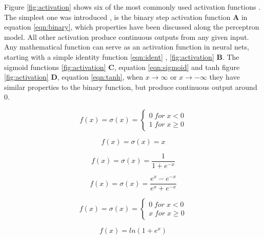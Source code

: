 Figure \ref{fig:activation} shows six of the most commonly used activation functions
\cite{warner1996understanding}. The simplest one was introduced , is the binary step activation function \textbf{A} in
equation \ref{eqn:binary}, which properties have been discussed along the perceptron model. All other
activation produce continuous outputs from any given input. Any mathematical function can serve as
an activation function in neural nets, starting with a simple identity function \ref{eqn:ident} ,
\ref{fig:activation} \textbf{B}.  The sigmoid functions \ref{fig:activation} \textbf{C}, equation \ref{eqn:sigmoid}
and tanh figure \ref{fig:activation} \textbf{D}, equation \ref{eqn:tanh}, when $x \rightarrow \infty$ or
$x \rightarrow -\infty$ they have similar properties to the binary function, but produce continuous output
around 0.

\begin{equation}
 f(x)= \sigma(x) = \left\{
 \begin{array}{ll}
  0 \; for \; x < 0 \\ 
  1 \; for \; x \geq 0
 \end{array}
\right .
\label{eqn:binary}
\end{equation}

\begin{equation}
 f(x) = \sigma(x) = x
 \label{eqn:ident}
\end{equation}
       
\begin{equation}
 f(x) = \sigma(x) = \frac{1}{1+e^{-x}} 
 \label{eqn:sigmoid}
\end{equation}

\begin{equation}
 f(x) = \sigma(x) = \frac{e^x - e^{-x}}{e^x + e^{-x}}
 \label{eqn:tanh}
\end{equation}

\begin{equation}
  f(x)= \sigma(x) = \left\{
 \begin{array}{ll}
  0 \; for \; x < 0 \\ 
  x \; for \; x \geq 0
 \end{array}
\right .
\label{eqn:relu}
\end{equation}

\begin{equation}
  f(x) = ln(1+e^x)
 \label{eqn:softplus}
\end{equation}

